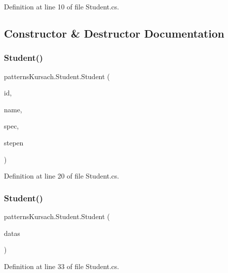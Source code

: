 Definition at line 10 of file Student.\+cs.



\subsection{Constructor \& Destructor Documentation}
\mbox{\label{classpatterns_kursach_1_1_student_ab7bf302da763ef12015e8943ec233c7c}} 
\subsubsection{\texorpdfstring{Student()}{Student()}\hspace{0.1cm}{\footnotesize\ttfamily [1/3]}}
{\footnotesize\ttfamily patterns\+Kursach.\+Student.\+Student (\begin{DoxyParamCaption}\item[{int}]{id,  }\item[{string}]{name,  }\item[{string}]{spec,  }\item[{string}]{stepen }\end{DoxyParamCaption})}



Definition at line 20 of file Student.\+cs.

\mbox{\label{classpatterns_kursach_1_1_student_aa012a5120419833a128fafb8a8755c6b}} 
\subsubsection{\texorpdfstring{Student()}{Student()}\hspace{0.1cm}{\footnotesize\ttfamily [2/3]}}
{\footnotesize\ttfamily patterns\+Kursach.\+Student.\+Student (\begin{DoxyParamCaption}\item[{Data\+Row}]{datas }\end{DoxyParamCaption})}



Definition at line 33 of file Student.\+cs.

